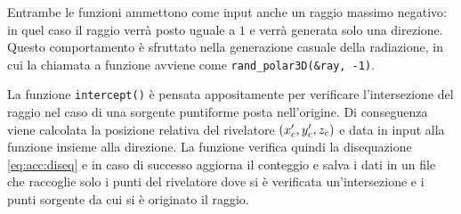         Entrambe le funzioni ammettono come input anche un raggio massimo negativo: in quel caso il raggio verrà posto uguale a $1$ e verrà generata solo una direzione. Questo comportamento è sfruttato nella generazione casuale della radiazione, in cui la chiamata a funzione avviene come \verb|rand_polar3D(&ray, -1)|.
        
        La funzione \verb|intercept()| è pensata appositamente per verificare l'intersezione del raggio nel caso di una sorgente puntiforme posta nell'origine. Di conseguenza viene calcolata la posizione relativa del rivelatore $\pqty{x_c', y_c', z_c}$ e data in input alla funzione insieme alla direzione. La funzione verifica quindi la disequazione \eqref{eq:acc:diseq} e in caso di successo aggiorna il conteggio e salva i dati in un file che raccoglie solo i punti del rivelatore dove si è verificata un'intersezione e i punti sorgente da cui si è originato il raggio.